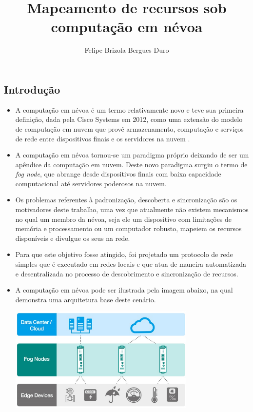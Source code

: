 \documentclass[a0,portrait]{lab-poster}
\title{Mapeamento de recursos sob computação em névoa}
\author{Felipe Brizola Bergues Duro}
\begin{document}
\maketitle


\begin{multicols}{2} 
\section*{Introdução}
\Large
\justifying
\begin{itemize}

\item A computação em névoa é um termo relativamente novo e teve sua primeira definição, dada pela Cisco Systems em 2012, como uma extensão do modelo de computação em nuvem que provê armazenamento, computação e serviços de rede entre dispositivos finais e os servidores na nuvem \cite{DBLP:journals/corr/RomanLM16}.
\item A computação em névoa tornou-se um paradigma próprio deixando de ser um apêndice da computação em nuvem. Deste novo paradigma surgiu o termo de \textit{fog node}, que abrange desde dispositivos finais com baixa capacidade computacional até servidores poderosos na nuvem.
\item Os problemas referentes à padronização, descoberta e sincronização são os motivadores deste trabalho, uma vez que atualmente não existem mecanismos no qual um membro da névoa, seja ele um dispositivo com limitações de memória e processamento ou um computador robusto, mapeiem os recursos disponíveis e divulgue os seus na rede.
\item Para que este objetivo fosse atingido, foi projetado um protocolo de rede simples que é executado em redes locais e que atua de maneira automatizada e desentralizada no processo de descobrimento e sincronização de recursos.
\item A computação em névoa pode ser ilustrada pela imagem abaixo, na qual demonstra uma arquitetura base deste cenário.

\begin{center}
\includegraphics[width=0.9\linewidth]{fig/fig1.pdf}
\end{center}



\end{itemize}
\end{multicols}
\end{document}

